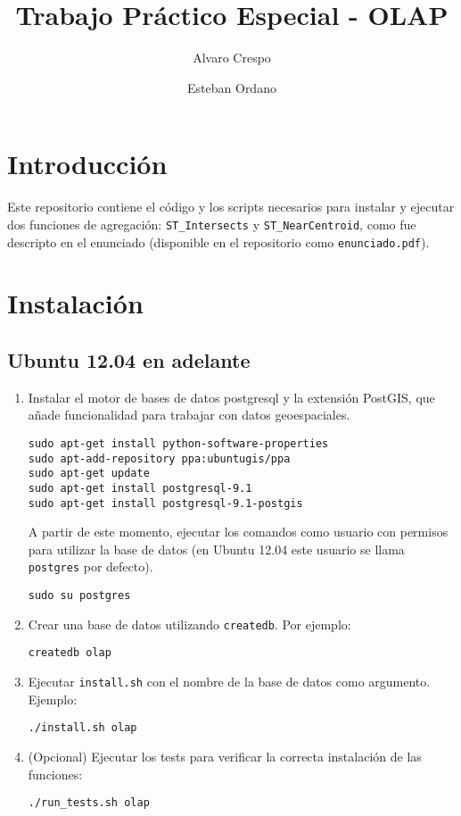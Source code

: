 \documentclass[a4paper,12pt]{article}
\begin{document}
\title{Trabajo Práctico Especial - OLAP}

\author{
{\rm Alvaro Crespo}
\and
{\rm Esteban Ordano}
}
\date{}

\maketitle

\section{Introducción}

Este repositorio contiene el código y los scripts necesarios para
instalar y ejecutar dos funciones de agregación: \texttt{ST\_Intersects}
y \texttt{ST\_NearCentroid}, como fue descripto en el enunciado
(disponible en el repositorio como \texttt{enunciado.pdf}).

\section{Instalación}

\subsection{Ubuntu 12.04 en adelante}

\begin{enumerate}
\def\labelenumi{\arabic{enumi}.}
\item
  Instalar el motor de bases de datos postgresql y la extensión PostGIS,
  que añade funcionalidad para trabajar con datos geoespaciales.

\begin{verbatim}
sudo apt-get install python-software-properties
sudo apt-add-repository ppa:ubuntugis/ppa
sudo apt-get update
sudo apt-get install postgresql-9.1
sudo apt-get install postgresql-9.1-postgis
\end{verbatim}

  A partir de este momento, ejecutar los comandos como usuario con
  permisos para utilizar la base de datos (en Ubuntu 12.04 este usuario
  se llama \texttt{postgres} por defecto).

\begin{verbatim}
sudo su postgres
\end{verbatim}

\item
  Crear una base de datos utilizando \texttt{createdb}. Por ejemplo:

\begin{verbatim}
createdb olap
\end{verbatim}
\item
  Ejecutar \texttt{install.sh} con el nombre de la base de datos como
  argumento. Ejemplo:

\begin{verbatim}
./install.sh olap
\end{verbatim}
\item
  (Opcional) Ejecutar los tests para verificar la correcta instalación
  de las funciones:

\begin{verbatim}
./run_tests.sh olap
\end{verbatim}
\end{enumerate}
\end{document}
